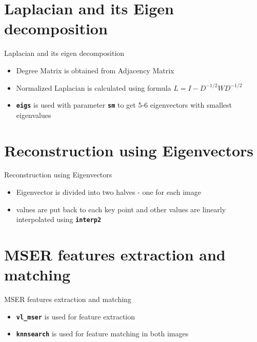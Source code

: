 \documentclass{beamer}
\begin{document}
\section{Laplacian and its Eigen decomposition}
\begin{frame}{Laplacian and its eigen decomposition}
\begin{itemize}

\item Degree Matrix is obtained from Adjacency Matrix
\item Normalized Laplacian is calculated using formula $L = I - D^{-1/2}WD^{-1/2}$
\item \textbf{\texttt{eigs}} is used with parameter \textbf{\texttt{sm}} to get 5-6 eigenvectors with smallest eigenvalues

\end{itemize}
\end{frame}


\section{Reconstruction using Eigenvectors}
\begin{frame}{Reconstruction using Eigenvectors}
\begin{itemize}

\item Eigenvector is divided into two halves - one for each image
\item values are put back to each key point and other values are linearly interpolated using \textbf{\texttt{interp2}}

\end{itemize}
\end{frame}


\section{MSER features extraction and matching}
\begin{frame}{MSER features extraction and matching}
\begin{itemize}
	\item \textbf{\texttt{vl\_mser}} is used for feature extraction
    \item \textbf{\texttt{knnsearch}} is used for feature matching in both images
\end{itemize}
\end{frame}
\end{document}
